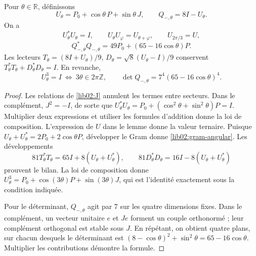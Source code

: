 \begin{theorem}
\label{lib02:Utheta}
Pour \(\theta\in\mathbb R\), définissons
\[
 U_\theta=P_0+\cos\theta\,P+\sin\theta\,J,\qquad
 Q_{-,\theta}=8I-U_\theta.
\]
On a
\[
 U_\theta^*U_\theta=I,\qquad
 U_\theta U_\varphi=U_{\theta+\varphi},\qquad U_{2\pi/3}=U,
\]
\begin{equation}
 Q_{-,\theta}^*Q_{-,\theta}
 =49P_0+(65-16\cos\theta)P.
 \label{lib02:gram-angular}
\end{equation}
Les lecteurs \(T_\theta=(8I+U_\theta)/9\), \(D_\theta=\sqrt8(U_\theta-I)/9\) conservent \(T_\theta^*T_\theta+D_\theta^*D_\theta=I\). En revanche,
\[
 U_\theta^3=I\ \Longleftrightarrow\ 3\theta\in2\pi\mathbb Z,
 \qquad
 \det Q_{-,\theta}=7^4(65-16\cos\theta)^4.
\]
\end{theorem}
\begin{proof}
Les relations de \cref{lib02:J} annulent les termes entre secteurs.
Dans le complément, \(J^2=-I\), de sorte que
\(U_\theta^*U_\theta=P_0+(\cos^2\theta+\sin^2\theta)P=I\).
Multiplier deux expressions et utiliser les formules d’addition donne la
loi de composition. L’expression de \(U\) dans le lemme donne la valeur
ternaire. Puisque
\(U_\theta+U_\theta^*=2P_0+2\cos\theta P\), développer le
Gram donne \eqref{lib02:gram-angular}. Les développements
\[
 81T_\theta^*T_\theta=65I+8(U_\theta+U_\theta^*),\qquad
 81D_\theta^*D_\theta=16I-8(U_\theta+U_\theta^*)
\]
prouvent le bilan. La loi de composition donne \(U_\theta^3=P_0+\cos(3\theta)P+\sin(3\theta)J\), qui est l'identité exactement sous la condition indiquée.

Pour le déterminant, \(Q_{-,\theta}\) agit par 7 sur les quatre
dimensions fixes. Dans le complément, un vecteur unitaire \(e\) et
\(Je\) forment un couple orthonormé ; leur complément orthogonal est stable
sous \(J\). En répétant, on obtient quatre plans, sur chacun
desquels le déterminant est
\((8-\cos\theta)^2+\sin^2\theta=65-16\cos\theta\).
Multiplier les contributions démontre la formule.
\end{proof}

